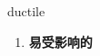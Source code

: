 
\begin{frame}
{\huge ductile}
\begin{center}
\begin{enumerate}\Large
  \item \textbf{易受影响的}
\end{enumerate}
\end{center}
\end{frame}
